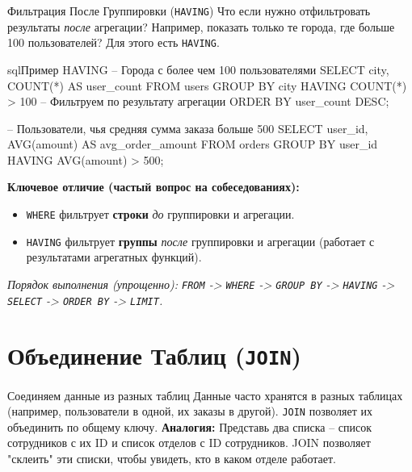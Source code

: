 \begin{alerttextbox}{Фильтрация После Группировки (\texttt{HAVING})}
    Что если нужно отфильтровать результаты \textit{после} агрегации? Например, показать только те города, где больше 100 пользователей? Для этого есть \texttt{HAVING}.
    \begin{codebox}{sql}{Пример HAVING}
    -- Города с более чем 100 пользователями
    SELECT city, COUNT(*) AS user_count
    FROM users
    GROUP BY city
    HAVING COUNT(*) > 100 -- Фильтруем по результату агрегации
    ORDER BY user_count DESC;

    -- Пользователи, чья средняя сумма заказа больше 500
    SELECT user_id, AVG(amount) AS avg_order_amount
    FROM orders
    GROUP BY user_id
    HAVING AVG(amount) > 500;
    \end{codebox}
    \textbf{Ключевое отличие (частый вопрос на собеседованиях):}
    \begin{itemize}
        \item \texttt{WHERE} фильтрует \textbf{строки} \textit{до} группировки и агрегации.
        \item \texttt{HAVING} фильтрует \textbf{группы} \textit{после} группировки и агрегации (работает с результатами агрегатных функций).
    \end{itemize}
    \textit{Порядок выполнения (упрощенно): \texttt{FROM} -> \texttt{WHERE} -> \texttt{GROUP BY} -> \texttt{HAVING} -> \texttt{SELECT} -> \texttt{ORDER BY} -> \texttt{LIMIT}.}
\end{alerttextbox}

\section{Объединение Таблиц (\texttt{JOIN})}

\begin{myblock}{Соединяем данные из разных таблиц}
    Данные часто хранятся в разных таблицах (например, пользователи в одной, их заказы в другой). \texttt{JOIN} позволяет их объединить по общему ключу.
    \textbf{Аналогия:} Представь два списка – список сотрудников с их ID и список отделов с ID сотрудников. JOIN позволяет "склеить" эти списки, чтобы увидеть, кто в каком отделе работает.
\end{myblock}

